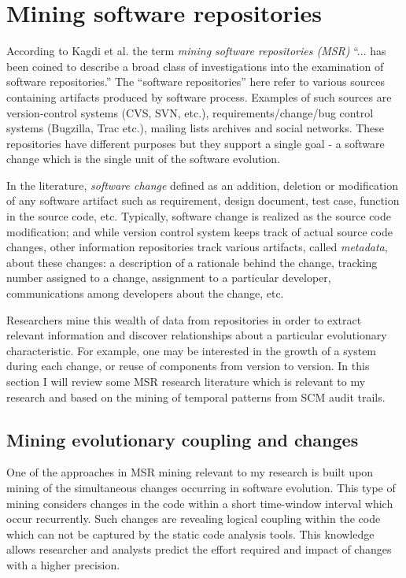 \section{Mining software repositories}\label{evolution.discovery}
According to Kagdi et al. \cite{citeulike:4534888} the term \textit{mining software repositories (MSR)} ``... has been coined to describe a broad class of investigations into the examination of software repositories.'' The ``software repositories'' here refer to various sources containing artifacts produced by software process. Examples of such sources are version-control systems (CVS, SVN, etc.), requirements/change/bug control systems (Bugzilla, Trac etc.), mailing lists archives and social networks. These repositories have different purposes but they support a single goal - a software change which is the single unit of the software evolution. 

In the literature, \textit{software change} defined as an addition, deletion or modification of any software artifact such as requirement, design document, test case, function in the source code, etc. Typically, software change is realized as the source code modification; and while version control system keeps track of actual source code changes, other information repositories track various artifacts, called \textit{metadata}, about these changes: a description of a rationale behind the change, tracking number assigned to a change, assignment to a particular developer, communications among developers about the change, etc.

Researchers mine this wealth of data from repositories in order to extract relevant information and discover relationships about a particular evolutionary characteristic. For example, one may be interested in the growth of a system during each change, or reuse of components from version to version. In this section I will review some MSR research literature which is relevant to my research and based on the mining of temporal patterns from SCM audit trails.

\subsection{Mining evolutionary coupling and changes}
One of the approaches in MSR mining relevant to my research is built upon mining of the simultaneous changes occurring in software evolution. This type of mining considers changes in the code within a short time-window interval which occur recurrently. Such changes are revealing logical coupling within the code which can not be captured by the static code analysis tools. This knowledge allows researcher and analysts predict the effort required and impact of changes with a higher precision. 

